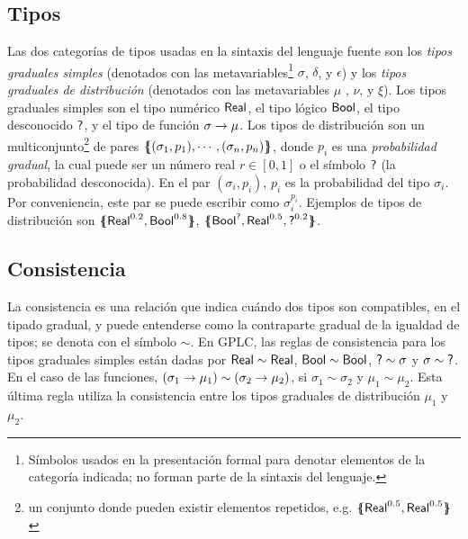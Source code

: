 \subsection{Tipos}\label{par:gplc-types} Las dos categorías de tipos
usadas en la sintaxis del lenguaje fuente son los \emph{tipos
  graduales simples} (denotados con las
metavariables\footnote{Símbolos usados en la presentación formal para
  denotar elementos de la categoría indicada; no forman parte de la
  sintaxis del lenguaje.} $\sigma$, $\delta$, y $\epsilon$) y los
\emph{tipos graduales de distribución} (denotados con las
metavariables $\mu$ , $\nu$, y $\xi$). Los tipos graduales simples son
el tipo numérico $\mathord{\text{\sffamily Real}}$, el tipo lógico $\mathord{\text{\sffamily Bool}}$, el tipo desconocido
$\mathord{\text{\sffamily ?}}$, y el tipo de función $\sigma \to \mu$. Los tipos de
distribución son un multiconjunto\footnote{un conjunto donde pueden
  existir elementos repetidos, e.g. $\{\mskip-7mu\{ {\mathord{\text{\sffamily Real}}^{0.5},\mathord{\text{\sffamily Real}}^{0.5}} \}\mskip-7mu\}$}
de pares $\{\mskip-7mu\{ {(\sigma_1,p_1),\cdots,(\sigma_n,p_n)} \}\mskip-7mu\}$, donde $p_i$
es una \emph{probabilidad gradual}, la cual puede ser un número real
$r\in[0,1]$ o el símbolo $\mathord{\text{\sffamily ?}}$ (la probabilidad
desconocida). En el par $(\sigma_i,p_i)$, $p_i$ es la
  probabilidad del tipo $\sigma_i$. Por conveniencia, este par se puede escribir como $\sigma_i^{p_i}$. Ejemplos de tipos de distribución
son $\{\mskip-7mu\{ {\mathord{\text{\sffamily Real}}^{0.2},\mathord{\text{\sffamily Bool}}^{0.8}} \}\mskip-7mu\}$,
$\{\mskip-7mu\{ {\mathord{\text{\sffamily Bool}}^{\mathord{\text{\sffamily ?}}}, \mathord{\text{\sffamily Real}}^{0.5}, \mathord{\text{\sffamily ?}}^{0.2}} \}\mskip-7mu\}$.




\subsection{Consistencia}\label{par:consistency} La consistencia es
una relación que indica cuándo dos tipos son compatibles, en el tipado
gradual, y puede entenderse como la contraparte gradual
  de la igualdad de tipos; se denota con el símbolo $\sim$.  En GPLC,
las reglas de consistencia para los tipos graduales simples están
dadas por $\mathord{\text{\sffamily Real}}\sim\mathord{\text{\sffamily Real}}$, $\mathord{\text{\sffamily Bool}}\sim\mathord{\text{\sffamily Bool}}$, $\mathord{\text{\sffamily ?}}\sim \sigma$ y
$\sigma \sim\mathord{\text{\sffamily ?}}$. En el caso de las funciones,
$(\sigma_1 \to \mu_1) \sim (\sigma_2 \to \mu_2)$, si
$\sigma_1\sim\sigma_2$ y $\mu_1\sim\mu_2$. Esta última regla utiliza
la consistencia entre los tipos graduales de distribución $\mu_1$ y
$\mu_2$.

